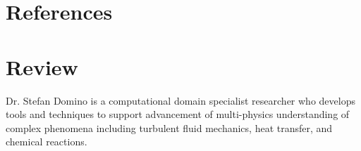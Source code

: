 \documentclass[letterpaper]{twentysecondcv_spd} %
\begin{document}
\section{References}

\begin{twentysingle} %
\end{twentysingle}

\section{Review}

Dr. Stefan Domino is a computational domain specialist researcher who develops tools and techniques
to support advancement of multi-physics understanding of complex phenomena including turbulent 
fluid mechanics, heat transfer, and chemical reactions. 
\end{document}
